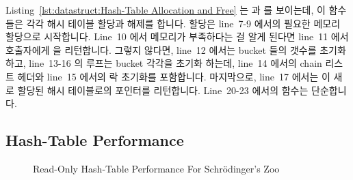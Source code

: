 Listing~\ref{lst:datastruct:Hash-Table Allocation and Free}
는  과  를 보이는데, 이 함수들은 각각
해시 테이블 할당과 해제를 합니다.
할당은 line~7-9 에서의 필요한 메모리 할당으로 시작합니다.
Line~10 에서 메모리가 부족하다는 걸 알게 된다면 line~11 에서 호출자에게
 을 리턴합니다.
그렇지 않다면, line~12 에서는 bucket 들의 갯수를 초기화하고, line~13-16 의
루프는 bucket 각각을 초기화 하는데, line~14 에서의 chain 리스트 헤더와 line~15
에서의 락 초기화를 포함합니다.
마지막으로, line~17 에서는 이 새로 할당된 해시 테이블로의 포인터를 리턴합니다.
Line~20-23 에서의  함수는 단순합니다.

\subsection{Hash-Table Performance}
\label{sec:datastruct:Hash-Table Performance}

\begin{figure}[tb]
\centering
{}
\caption{Read-Only Hash-Table Performance For Schr\"odinger's Zoo}
\label{fig:datastruct:Read-Only Hash-Table Performance For Schroedinger's Zoo}
\end{figure}

